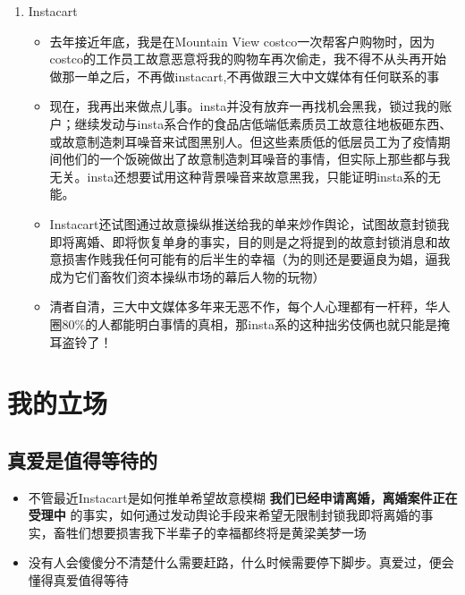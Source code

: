 \documentclass[9pt, b5paper]{article}
\begin{document}
\begin{enumerate}
\item Instacart
\label{sec-7-5-4-1}
\begin{itemize}
\item 去年接近年底，我是在Mountain View costco一次帮客户购物时，因为costco的工作员工故意恶意将我的购物车再次偷走，我不得不从头再开始做那一单之后，不再做instacart,不再做跟三大中文媒体有任何联系的事
\item 现在，我再出来做点儿事。insta并没有放弃一再找机会黑我，锁过我的账户；继续发动与insta系合作的食品店低端低素质员工故意往地板砸东西、或故意制造刺耳噪音来试图黑别人。但这些素质低的低层员工为了疫情期间他们的一个饭碗做出了故意制造刺耳噪音的事情，但实际上那些都与我无关。insta还想要试用这种背景噪音来故意黑我，只能证明insta系的无能。
\item Instacart还试图通过故意操纵推送给我的单来炒作舆论，试图故意封锁我即将离婚、即将恢复单身的事实，目的则是之将提到的故意封锁消息和故意损害作贱我任何可能有的后半生的幸福（为的则还是要逼良为娼，逼我成为它们畜牧们资本操纵市场的幕后人物的玩物）
\item 清者自清，三大中文媒体多年来无恶不作，每个人心理都有一杆秤，华人圈80\%的人都能明白事情的真相，那insta系的这种拙劣伎俩也就只能是掩耳盗铃了！
\end{itemize}
\end{enumerate}

\section{我的立场}
\label{sec-8}
\subsection{真爱是值得等待的}
\label{sec-8-1}
\begin{itemize}
\item 不管最近Instacart是如何推单希望故意模糊 \textbf{我们已经申请离婚，离婚案件正在受理中} 的事实，如何通过发动舆论手段来希望无限制封锁我即将离婚的事实，畜牲们想要损害我下半辈子的幸福都终将是黄梁美梦一场
\item 没有人会傻傻分不清楚什么需要赶路，什么时候需要停下脚步。真爱过，便会懂得真爱值得等待
\end{itemize}
\end{document}
